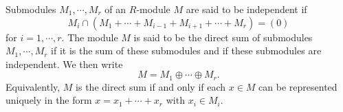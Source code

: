 Submodules $M_1, \cdots, M_r$ of an $R$-module $M$ are said to be independent if
$$M_i \cap (M_1 + \cdots + M_{i-1} + M_{i+1} + \cdots + M_r) = (0)$$
for $i = 1, \cdots, r$. The module $M$ is said to be the direct sum of submodules $M_1, \cdots, M_r$ if it is the sum of these submodules and if these submodules are independent. We then write
$$M = M_1 \oplus \cdots \oplus M_r.$$
Equivalently, $M$ is the direct sum if and only if each $x \in M$ can be represented uniquely in the form $x = x_1 + \cdots + x_r$ with $x_i \in M_i$.

